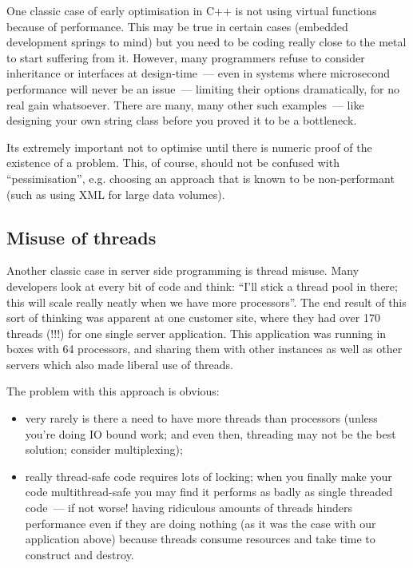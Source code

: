\documentclass{memoir}
\begin{document}
One classic case of early optimisation in C++ is not using virtual
functions because of performance. This may be true in certain cases
(embedded development springs to mind) but you need to be coding
really close to the metal to start suffering from it. However, many
programmers refuse to consider inheritance or interfaces at
design-time~--- even in systems where microsecond performance will
never be an issue~--- limiting their options dramatically, for no real
gain whatsoever. There are many, many other such examples~--- like
designing your own string class before you proved it to be a
bottleneck.

Its extremely important not to optimise until there is numeric proof
of the existence of a problem. This, of course, should not be confused
with ``pessimisation'', e.g. choosing an approach that is known to be
non-performant (such as using XML for large data volumes).

\subsection{Misuse of threads}

Another classic case in server side programming is thread misuse. Many
developers look at every bit of code and think: ``I'll stick a thread
pool in there; this will scale really neatly when we have more
processors''. The end result of this sort of thinking was apparent at
one customer site, where they had over 170 threads (!!!)  for one
single server application. This application was running in boxes with
64 processors, and sharing them with other instances as well as other
servers which also made liberal use of threads.

The problem with this approach is obvious:

\begin{itemize}
\item very rarely is there a need to have more threads than processors
  (unless you're doing IO bound work; and even then, threading may not
  be the best solution; consider multiplexing);
\item really thread-safe code requires lots of locking; when you
  finally make your code multithread-safe you may find it performs as
  badly as single threaded code~--- if not worse!  having ridiculous
  amounts of threads hinders performance even if they are doing
  nothing (as it was the case with our application above) because
  threads consume resources and take time to construct and destroy.
\end{itemize}
\end{document}
